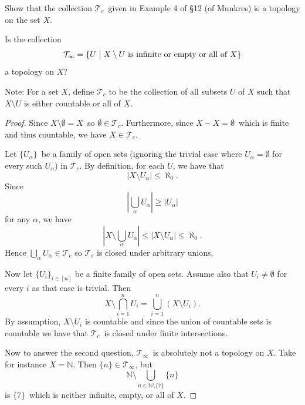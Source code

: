 \documentclass[11pt]{article}
\begin{document}
\begin{prob}[Problem 3]
    Show that the collection $\mathcal T_c$ given in 
    Example 4 of \S{}12 (of Munkres) is a topology 
    on the set $X$. 

    Is the collection 
    \[
        \mathcal T_\infty = \{U \bigm| X \setminus U \ 
        \text{is infinite or empty or all of} \ X\}
    \]
    a topology on $X$?

    Note: For a set $X$, define 
    $\mathcal T_c$ to be the collection of all 
    subsets $U$ of $X$ such that $X \setminus U$ is 
    either countable or all of $X$. 
\end{prob} 
\begin{proof}
    Since $X \setminus \emptyset = X$ so 
    $\emptyset \in \mathcal T_c$. 
    Furthermore, since $X - X = \emptyset$ which is 
    finite and thus countable, we have 
    $X \in \mathcal T_c$. 

    Let $\{U_\alpha\}$ be a family of open sets 
    (ignoring the trivial case where $U_\alpha = \emptyset$ for 
    every such $U_\alpha$)
    in $\mathcal T_c$. By definition, 
    for each $U$, we have that 
    \[
        |X \setminus U_\alpha| \leq \aleph_0. 
    \]
    Since 
    \[
        \left|\bigcup_{\alpha} U_\alpha\right| \geq |U_\alpha|
    \]
    for any $\alpha$, we have 
    \[
        \left|X \setminus \bigcup_{\alpha}U_\alpha\right| 
        \leq |X \setminus U_\alpha| \leq \aleph_0. 
    \]
    Hence $\bigcup_{\alpha} U_\alpha \in \mathcal T_c$ so 
    $\mathcal T_c$ is closed under arbitrary unions. 

    Now let $\{U_i\}_{i\in[n]}$ be a finite family of open sets. 
    Assume also that $U_i \neq \emptyset$ for every $i$ as that 
    case is trivial. Then 
    \[
        X \setminus \bigcap_{i=1}^n U_i 
        = \bigcup_{i=1}^n (X\setminus U_i). 
    \]
    By assumption, $X\setminus U_i$ is countable and since the 
    union of countable sets is countable we have 
    that $\mathcal T_c$ is closed under finite intersections. 

    Now to answer the second question, $\mathcal T_\infty$ is 
    absolutely not a topology on $X$. Take for instance 
    $X = \mathbb N$. Then $\{n\} \in \mathcal T_\infty$, 
    but 
    \[
        \mathbb N \setminus \bigcup_{n \in \mathbb N \setminus \{7\}} \{n\}  
    \]
    is $\{7\}$ which is neither infinite, empty, or all of $X$. 
\end{proof}
\end{document}
